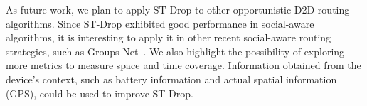As future work, we plan to apply ST-Drop to other opportunistic D2D routing algorithms. Since ST-Drop exhibited good performance in social-aware algorithms, it is interesting to apply
it in other recent social-aware routing strategies, such as Groups-Net~\cite{nunes2016groups}. We also highlight the possibility of exploring more metrics to measure space and time
coverage. Information obtained from the device's context, such as battery information and actual spatial information (GPS), could be used to improve ST-Drop.